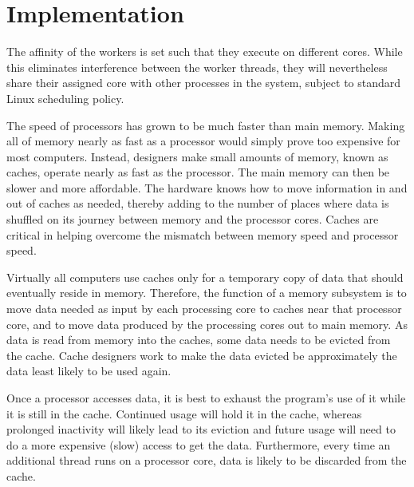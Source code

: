 
\chapter{Implementation}
\label{chap:locality-implementation}


The affinity of the workers is set such that they execute on different
cores. While this eliminates interference between the worker threads,
they will nevertheless share their assigned core with other processes
in the system, subject to standard Linux scheduling policy.



The speed of processors has grown to be much faster than main
memory. Making all of memory nearly as fast as a processor would
simply prove too expensive for most computers. Instead, designers make
small amounts of memory, known as caches, operate nearly as fast as
the processor. The main memory can then be slower and more
affordable. The hardware knows how to move information in and out of
caches as needed, thereby adding to the number of places where data is
shuffled on its journey between memory and the processor cores. Caches
are critical in helping overcome the mismatch between memory speed and
processor speed.

Virtually all computers use caches only for a temporary copy of data
that should eventually reside in memory. Therefore, the function of a
memory subsystem is to move data needed as input by each processing
core to caches near that processor core, and to move data produced by
the processing cores out to main memory. As data is read from memory
into the caches, some data needs to be evicted from the cache. Cache
designers work to make the data evicted be approximately the data
least likely to be used again.

Once a processor accesses data, it is best to exhaust the program’s
use of it while it is still in the cache. Continued usage will hold it
in the cache, whereas prolonged inactivity will likely lead to its
eviction and future usage will need to do a more expensive (slow)
access to get the data. Furthermore, every time an additional thread
runs on a processor core, data is likely to be discarded from the
cache.

